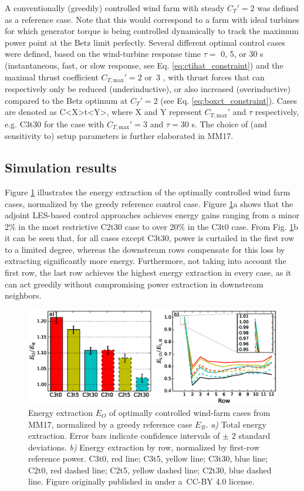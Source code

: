 \documentclass[wes, manuscript]{copernicus}
\newcommand{\revision}[1]{{\color{blue} #1}}
\begin{document}
A conventionally (greedily) controlled wind farm with steady $C_T' = 2$ was defined as a reference case. \revision{Note that this would correspond to a farm with ideal turbines for which generator torque is being controlled dynamically to track the maximum power point at the Betz limit perfectly.} Several different optimal control cases were defined, based on the wind-turbine response time $\tau = $ 0, 5, or 30 s (instantaneous, fast, or slow response, see Eq. \ref{eq:ctihat_constraint}) and the maximal thrust coefficient $C_{T,\text{max}}' = 2$ or~3 \revision{, with thrust forces that can respectively only be reduced (underinductive), or also increased (overinductive) compared to the Betz optimum at $C_T' = 2$} (see Eq. \ref{eq:boxct_constraint}). Cases are denoted as C<X>t<Y>, where X and Y represent $C_{T,\text{max}}'$ and $\tau$ respectively, e.g. C3t30  for the case with $C_{T,\text{max}}' = 3$ and $\tau = 30$ s. \revision{The choice of (and sensitivity to) setup parameters is further elaborated in MM17.}

\subsection{Simulation results}

Figure \ref{fig:power_MM17} illustrates the energy extraction of the optimally controlled wind farm cases, normalized by the greedy reference control case. Figure \ref{fig:power_MM17}a shows that the adjoint LES-based control approaches achieves energy gains ranging from a minor 2\% in the most restrictive C2t30 case to over 20\% in the C3t0 case. From Fig. \ref{fig:power_MM17}b it can be seen that, for all cases except C3t30, power is curtailed in the first row to a limited degree, whereas the downstream rows compensate for this loss by extracting significantly more energy. Furthermore, not taking into account the first row, the last row achieves the highest energy extraction in every case, as it can act greedily without compromising power extraction in downstream neighbors. 

\begin{figure}
	\includegraphics[width=\textwidth]{figure3}
	\caption{Energy extraction $E_O$ of optimally controlled wind-farm cases from MM17, normalized by a greedy reference case $E_R$. \emph{a)} Total energy extraction. Error bars indicate confidence intervals of $\pm$ 2 standard deviations. \emph{b)} Energy extraction by row, normalized by first-row reference power. C3t0, red line; C3t5, yellow line; C3t30, blue line; C2t0, red dashed line; C2t5, yellow dashed line; C2t30, blue dashed line. Figure originally published in \cite{munters2017optimal} under a~CC-BY 4.0 license.\label{fig:power_MM17}}
\end{figure}
\end{document}
